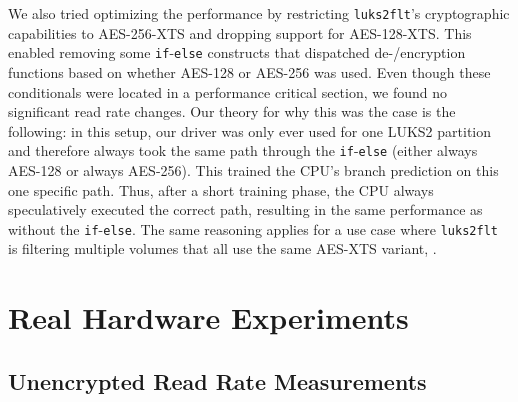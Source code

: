 
We also tried optimizing the performance by restricting \texttt{luks2flt}'s cryptographic capabilities to AES-256-XTS and dropping support for AES-128-XTS. This enabled removing some \texttt{if}-\texttt{else} constructs that dispatched de-/encryption functions based on whether AES-128 or AES-256 was used. Even though these conditionals were located in a performance critical section, we found no significant read rate changes. Our theory for why this was the case is the following: in this setup, our driver was only ever used for one LUKS2 partition and therefore always took the same path through the \texttt{if}-\texttt{else} (either always AES-128 or always AES-256). This trained the CPU's branch prediction on this one specific path. Thus, after a short training phase, the CPU always speculatively executed the correct path, resulting in the same performance as without the \texttt{if}-\texttt{else}. The same reasoning applies for a use case where \texttt{luks2flt} is filtering multiple volumes that all use the same AES-XTS variant, .

\section{Real Hardware Experiments}
\label{chap:performance.hwexperiments}

\subsection{Unencrypted Read Rate Measurements}
\label{chap:performance.hwexperiments.unencrypted}

